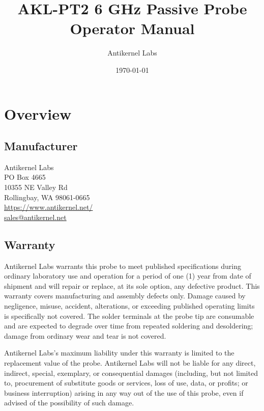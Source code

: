 \documentclass[11pt]{article}
\begin{document}
\title{AKL-PT2 6 GHz Passive Probe Operator Manual}
\author{Antikernel Labs}
\date{\today}

\maketitle
\thispagestyle{empty}

\pagebreak

\tableofcontents

\pagebreak

\section{Overview}

\subsection{Manufacturer}
Antikernel Labs \\
PO Box 4665 \\
10355 NE Valley Rd \\
Rollingbay, WA 98061-0665 \\
\href{https://www.antikernel.net/}{https://www.antikernel.net/} \\
\href{mailto:sales@antikernel.net}{sales@antikernel.net} \\

\subsection{Warranty}

Antikernel Labs warrants this probe to meet published specifications during ordinary laboratory use and operation for a
period of one (1) year from date of shipment and will repair or replace, at its sole option, any defective product.
This warranty covers manufacturing and assembly defects only. Damage caused by negligence, misuse, accident,
alterations, or exceeding published operating limits is specifically not covered. The solder terminals at the probe tip
are consumable and are expected to degrade over time from repeated soldering and desoldering; damage from ordinary wear
and tear is not covered.

Antikernel Labs's maximum liability under this warranty is limited to the replacement value of the probe. Antikernel
Labs will not be liable for any direct, indirect, special, exemplary, or consequential damages (including, but not
limited to, procurement of substitute goods or services, loss of use, data, or profits; or business interruption)
arising in any way out of the use of this probe, even if advised of the possibility of such damage.
\end{document}
